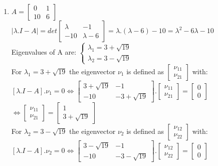 \documentclass[14pt,a4paper]{article}
\begin{document}
\begin{enumerate}
	\item
		$A = \begin{bmatrix} 0&1 \\ 10&6 \end{bmatrix} $ \\
		$|\lambda .I - A| = det\begin{bmatrix} \lambda & -1 \\ -10 & \lambda -6 \end{bmatrix} = \lambda .(\lambda -6) -10 = \lambda^2 - 6\lambda -10 $ \\
		Eigenvalues of A are: 
			$\begin{cases} \lambda_1 = 3 + \sqrt{19}  \\ \lambda_2 = 3 - \sqrt{19} \end{cases} $ \\
		For $\lambda_1 = 3 + \sqrt{19}$ the eigenvector $\nu_1$ is defined as $\begin{bmatrix}\nu_{11}\\ \nu_{21} \end{bmatrix}$ with: \\
			$[\lambda .I - A].\nu_1 = 0 \Leftrightarrow \begin{bmatrix} 3 + \sqrt{19} & -1 \\ -10& -3+\sqrt{19} \end{bmatrix} .\begin{bmatrix}\nu_{11}\\ \nu_{21} \end{bmatrix} = \begin{bmatrix} 0\\0 \end{bmatrix} $ \\
			$ \Leftrightarrow \begin{bmatrix} \nu_{11} \\\nu_{21}	\end{bmatrix} = \begin{bmatrix} 1 \\ 3+\sqrt{19}	\end{bmatrix}$ \\
		For $\lambda_2 = 3 - \sqrt{19}$ the eigenvector $\nu_2$ is defined as $\begin{bmatrix}\nu_{12}\\ \nu_{22} \end{bmatrix}$ with: \\
		$[\lambda .I - A].\nu_2 = 0 \Leftrightarrow \begin{bmatrix} 3 - \sqrt{19} & -1 \\ -10& -3-\sqrt{19} \end{bmatrix} .\begin{bmatrix}\nu_{12}\\ \nu_{22} \end{bmatrix} = \begin{bmatrix} 0\\0 \end{bmatrix} $ \\

\end{enumerate}
\end{document}
